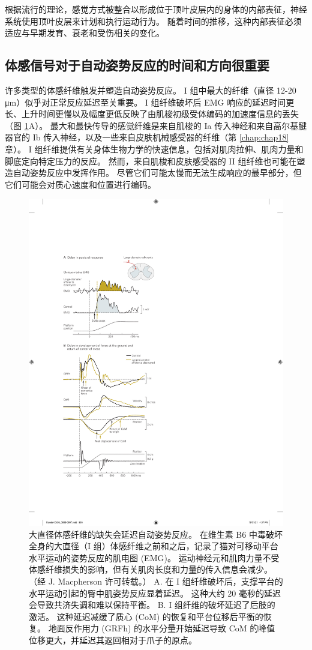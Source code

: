 根据流行的理论，感觉方式被整合以形成位于顶叶皮层内的身体的内部表征，神经系统使用顶叶皮层来计划和执行运动行为。 随着时间的推移，这种内部表征必须适应与早期发育、衰老和受伤相关的变化。

\subsection{体感信号对于自动姿势反应的时间和方向很重要}
许多类型的体感纤维触发并塑造自动姿势反应。 I 组中最大的纤维（直径 12-20 μm）似乎对正常反应延迟至关重要。 
I 组纤维破坏后 EMG 响应的延迟时间更长、上升时间更慢以及幅度更低反映了由肌梭初级受体编码的加速度信息的丢失（图 \ref{fig:36_9}A）。
最大和最快传导的感觉纤维是来自肌梭的 Ia 传入神经和来自高尔基腱器官的 Ib 传入神经，以及一些来自皮肤机械感受器的纤维（第 \ref{chap:chap18} 章）。 
I 组纤维提供有关身体生物力学的快速信息，包括对肌肉拉伸、肌肉力量和脚底定向特定压力的反应。 
然而，来自肌梭和皮肤感受器的 II 组纤维也可能在塑造自动姿势反应中发挥作用。 
尽管它们可能太慢而无法生成响应的最早部分，但它们可能会对质心速度和位置进行编码。

\begin{figure}[htbp]
	\centering
	\includegraphics[width=0.5\linewidth]{chap36/fig_36_9}
	\caption{大直径体感纤维的缺失会延迟自动姿势反应。 在维生素 B6 中毒破坏全身的大直径（I 组）体感纤维之前和之后，记录了猫对可移动平台水平运动的姿势反应的肌电图 (EMG)。 运动神经元和肌肉力量不受体感纤维损失的影响，但有关肌肉长度和力量的传入信息会减少。 （经 J. Macpherson 许可转载。） A. 在 I 组纤维破坏后，支撑平台的水平运动引起的臀中肌姿势反应显着延迟。 这种大约 20 毫秒的延迟会导致共济失调和难以保持平衡。 B. I 组纤维的破坏延迟了后肢的激活。 这种延迟减缓了质心 (CoM) 的恢复和平台位移后平衡的恢复。 地面反作用力 (GRFh) 的水平分量开始延迟导致 CoM 的峰值位移更大，并延迟其返回相对于爪子的原点。}
	\label{fig:36_9}
\end{figure}

